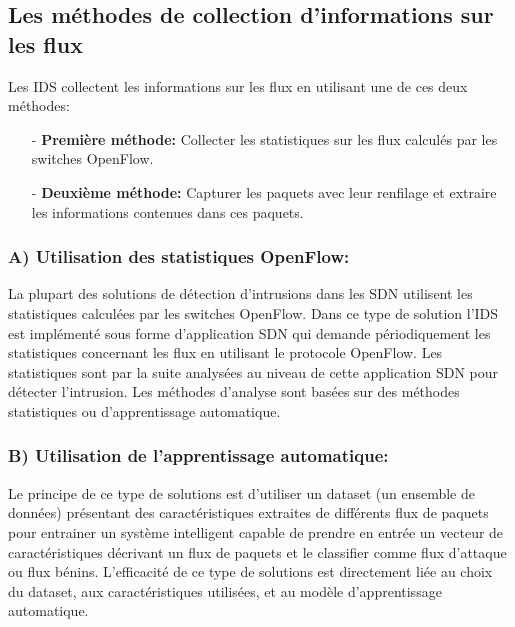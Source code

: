 \subsection{Les méthodes de collection d'informations sur les flux}
Les IDS collectent les informations sur les flux en utilisant une de ces deux méthodes:\\
\begin{itemize}
\item[-] \textbf{Première méthode:} Collecter les statistiques sur les flux calculés par les switches OpenFlow.\\
\item[-] \textbf{Deuxième méthode:} Capturer les paquets avec leur renfilage et extraire les informations contenues dans ces paquets. 
\end{itemize}

\subsubsection{A) Utilisation des statistiques OpenFlow:}
La plupart des solutions de détection d’intrusions dans les SDN utilisent les statistiques calculées par les switches OpenFlow. Dans ce type de solution l’IDS est implémenté sous forme d’application SDN qui demande périodiquement les statistiques concernant les flux en utilisant le protocole OpenFlow. Les statistiques sont par la suite analysées au niveau de cette application SDN pour détecter l’intrusion. Les méthodes d’analyse sont basées sur des méthodes statistiques ou d’apprentissage automatique.

\subsubsection{B) Utilisation de l’apprentissage automatique:}
Le principe de ce type de solutions est d’utiliser un dataset (un ensemble de données) présentant des caractéristiques extraites de différents flux de paquets pour entrainer un système intelligent capable de prendre en entrée un vecteur de caractéristiques décrivant un flux de paquets et le classifier comme flux d’attaque ou flux bénins. L’efficacité de ce type de solutions est directement liée au choix du dataset, aux caractéristiques utilisées, et au modèle d’apprentissage automatique.

